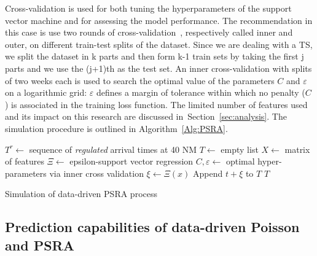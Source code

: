 \documentclass[draft,review]{elsarticle}
\begin{document}
Cross-validation is used for both tuning the hyperparameters of the support vector machine and for assessing the model performance. The recommendation in this case is use two rounds of cross-validation~\citep{cawley2010over}, respectively called inner and outer, on different train-test splits of the dataset. Since we are dealing with a TS, we split the dataset in k parts and then form k-1 train sets by taking the first j parts and we use the (j+1)th as the test set.
An inner cross-validation with splits of two weeks each is used to search the optimal value of the parameters \(C\) and \(\varepsilon\) on a logarithmic grid:
\(\varepsilon\) defines a margin of tolerance within which no penalty (\(C\)) is associated in the training loss function.
The limited number of features used and its impact on this research are discussed in~Section~\ref{sec:analysis}.
The simulation procedure is outlined in Algorithm~\ref{Alg:PSRA}.

\begin{algorithm}
\begin{algorithmic}[1]
    \STATE \(T^{r} \leftarrow \) sequence of \emph{regulated} arrival times at 40 NM
    \STATE \(T \leftarrow \) empty list
    \STATE \(X \leftarrow \) matrix of features
    \STATE \(\Xi \leftarrow \) epsilon-support vector regression
    \STATE \(C, \varepsilon \leftarrow \) optimal hyper-parameters via inner cross validation
        \STATE \(\xi \leftarrow \Xi(x)\)
        \STATE Append \(t + \xi\) to \(T\)
    \ENDFOR
    \RETURN \(T\)
\end{algorithmic}
\caption{Simulation of data-driven PSRA process}\label{Alg:PSRA}
\end{algorithm}

\subsection{Prediction capabilities of data-driven Poisson and \acs{PSRA}}\label{sec:dm_comparison}
\end{document}
